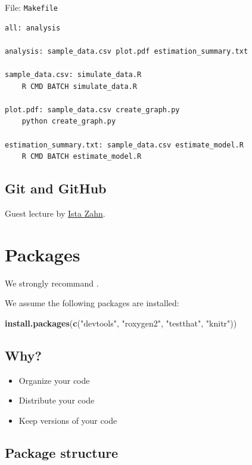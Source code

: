 \documentclass[]{book}
\newenvironment{Shaded}{\begin{snugshade}}{\end{snugshade}}
\newcommand{\KeywordTok}[1]{\textcolor[rgb]{0.13,0.29,0.53}{\textbf{#1}}}
\newcommand{\StringTok}[1]{\textcolor[rgb]{0.31,0.60,0.02}{#1}}
\newcommand{\NormalTok}[1]{#1}
\theoremstyle{definition}
\theoremstyle{definition}
\theoremstyle{definition}
\theoremstyle{remark}
\begin{document}
File: \texttt{Makefile}

\begin{verbatim}
all: analysis

analysis: sample_data.csv plot.pdf estimation_summary.txt

sample_data.csv: simulate_data.R
    R CMD BATCH simulate_data.R

plot.pdf: sample_data.csv create_graph.py
    python create_graph.py

estimation_summary.txt: sample_data.csv estimate_model.R
    R CMD BATCH estimate_model.R
\end{verbatim}

\section{Git and GitHub}\label{git-and-github}

Guest lecture by \href{https://www.iq.harvard.edu/people/ista-zahn}{Ista
Zahn}.

\chapter{Packages}\label{packages}

We strongly recommand \citet{Wickham2015}.

We assume the following packages are installed:

\begin{Shaded}
\begin{Highlighting}[]
\KeywordTok{install.packages}\NormalTok{(}\KeywordTok{c}\NormalTok{(}\StringTok{"devtools"}\NormalTok{, }\StringTok{"roxygen2"}\NormalTok{, }\StringTok{"testthat"}\NormalTok{, }\StringTok{"knitr"}\NormalTok{))}
\end{Highlighting}
\end{Shaded}

\section{Why?}\label{why}

\begin{itemize}
\item
  Organize your code
\item
  Distribute your code
\item
  Keep versions of your code
\end{itemize}

\section{Package structure}\label{package-structure}
\end{document}
